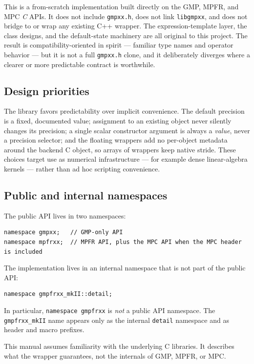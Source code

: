 \documentclass[11pt,a4paper]{article}
\newcommand{\code}[1]{\lstinline!#1!}
\begin{document}
This is a from-scratch implementation built directly on the GMP, MPFR, and MPC
\emph{C} APIs. It does not include \code{gmpxx.h}, does not link
\code{libgmpxx}, and does not bridge to or wrap any existing C++ wrapper. The
expression-template layer, the class designs, and the default-state machinery
are all original to this project. The result is compatibility-oriented in
spirit --- familiar type names and operator behavior --- but it is not a full
\code{gmpxx.h} clone, and it deliberately diverges where a clearer or more
predictable contract is worthwhile.

\subsection{Design priorities}

The library favors predictability over implicit convenience. The default
precision is a fixed, documented value; assignment to an existing object never
silently changes its precision; a single scalar constructor argument is always a
\emph{value}, never a precision selector; and the floating wrappers add no
per-object metadata around the backend C object, so arrays of wrappers keep
native stride. These choices target use as numerical infrastructure --- for
example dense linear-algebra kernels --- rather than ad hoc scripting
convenience.

\subsection{Public and internal namespaces}

The public API lives in two namespaces:

\begin{lstlisting}
namespace gmpxx;   // GMP-only API
namespace mpfrxx;  // MPFR API, plus the MPC API when the MPC header is included
\end{lstlisting}

The implementation lives in an internal namespace that is not part of the public
API:

\begin{lstlisting}
namespace gmpfrxx_mkII::detail;
\end{lstlisting}

In particular, \code{namespace gmpfrxx} is \emph{not} a public API namespace.
The \code{gmpfrxx_mkII} name appears only as the internal \code{detail}
namespace and as header and macro prefixes.

This manual assumes familiarity with the underlying C libraries. It describes
what the wrapper guarantees, not the internals of GMP, MPFR, or MPC.
\end{document}
